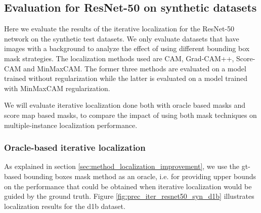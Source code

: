 \subsection{Evaluation for ResNet-50 on synthetic datasets} \label{sec:exp_iter_resnet50_syn}
Here we evaluate the results of the iterative localization for the ResNet-50 network on the synthetic test datasets. We only evaluate datasets that have images with a background to analyze the effect of using different bounding box mask strategies. The localization methods used are CAM, Grad-CAM++, Score-CAM and MinMaxCAM. The former three methods are evaluated on a model trained without regularization while the latter is evaluated on a model trained with MinMaxCAM regularization. 

We will evaluate iterative localization done both with oracle based masks and score map based masks, to compare the impact of using both mask techniques on multiple-instance localization performance.

\subsubsection{Oracle-based iterative localization}

As explained in section \ref{sec:method_localization_improvement}, we use the \acrshort{gt}-based bounding boxes mask method as an oracle, i.e. for providing upper bounds on the performance that could be obtained when iterative localization would be guided by the ground truth. Figure \ref{fig:prec_iter_resnet50_syn_d1b} illustrates localization results for the d1b dataset.

